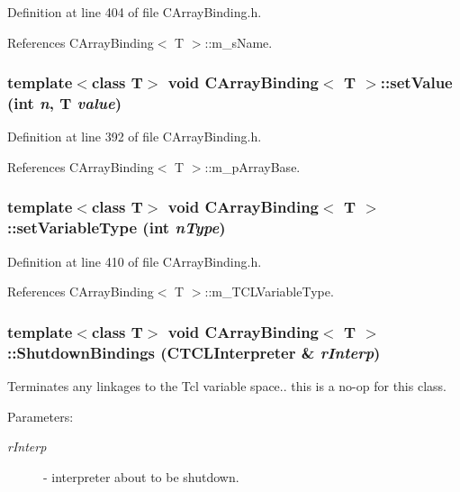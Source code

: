 Definition at line 404 of file CArray\-Binding.h.

References CArray\-Binding$<$ T $>$::m\_\-s\-Name.
\subsubsection{\setlength{\rightskip}{0pt plus 5cm}template$<$class T$>$ void CArray\-Binding$<$ T $>$::set\-Value (int {\em n}, T {\em value})\hspace{0.3cm}{\tt  [inline, protected]}}\label{classCArrayBinding_b0}




Definition at line 392 of file CArray\-Binding.h.

References CArray\-Binding$<$ T $>$::m\_\-p\-Array\-Base.
\subsubsection{\setlength{\rightskip}{0pt plus 5cm}template$<$class T$>$ void CArray\-Binding$<$ T $>$::set\-Variable\-Type (int {\em n\-Type})\hspace{0.3cm}{\tt  [inline, protected]}}\label{classCArrayBinding_b6}




Definition at line 410 of file CArray\-Binding.h.

References CArray\-Binding$<$ T $>$::m\_\-TCLVariable\-Type.
\subsubsection{\setlength{\rightskip}{0pt plus 5cm}template$<$class T$>$ void CArray\-Binding$<$ T $>$::Shutdown\-Bindings ({\bf CTCLInterpreter} \& {\em r\-Interp})\hspace{0.3cm}{\tt  [virtual]}}\label{classCArrayBinding_a12}


Terminates any linkages to the Tcl variable space.. this is a no-op for this class.\begin{Desc}
\item[Parameters: ]\par
\begin{description}
\item[{\em 
r\-Interp}]- interpreter about to be shutdown. \end{description}
\end{Desc}



